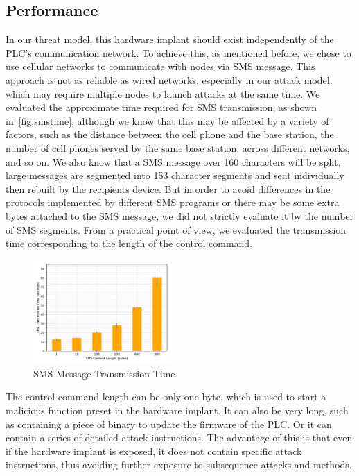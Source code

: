 \subsection{Performance}

In our threat model, this hardware implant should exist independently of the PLC's communication network. To achieve this, as mentioned before, we chose to use cellular networks to communicate with nodes via SMS message. This approach is not as reliable as wired networks, especially in our attack model, which may require multiple nodes to launch attacks at the same time. We evaluated the approximate time required for SMS transmission, as shown in~\autoref{fig:smstime}, although we know that this may be affected by a variety of factors, such as the distance between the cell phone and the base station, the number of cell phones served by the same base station, across different networks, and so on. We also know that a SMS message over 160 characters will be split, large messages are segmented into 153 character segments and sent individually then rebuilt by the recipients device. But in order to avoid differences in the protocols implemented by different SMS programs or there may be some extra bytes attached to the SMS message, we did not strictly evaluate it by the number of SMS segments. From a practical point of view, we evaluated the transmission time corresponding to the length of the control command.

\begin{figure}[th]
	\includegraphics[width=0.47\textwidth]{figures/smstime}
	\centering
	\caption{SMS Message Transmission Time}
	\label{fig:smstime}
\end{figure}

The control command length can be only one byte, which is used to start a malicious function preset in the hardware implant. It can also be very long, such as containing a piece of binary to update the firmware of the PLC. Or it can contain a series of detailed attack instructions. The advantage of this is that even if the hardware implant is exposed, it does not contain specific attack instructions, thus avoiding further exposure to subsequence attacks and methods.

